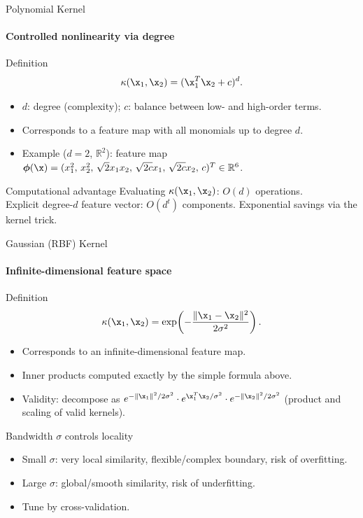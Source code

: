 \begin{frame}{Polynomial Kernel}
  \framesubtitle{Controlled nonlinearity via degree}
  \begin{block}{Definition}
    \[
      \kappa(\x_1,\x_2) = (\x_1^T\x_2 + c)^d.
    \]
  \end{block}
  \begin{itemize}
    \item $d$: degree (complexity); $c$: balance between low- and high-order terms.
    \item Corresponds to a feature map with all monomials up to degree $d$.
    \item Example ($d=2$, $\mathbb{R}^2$): feature map
          $\boldsymbol{\phi}(\x) = (x_1^2,\,x_2^2,\,\sqrt{2}x_1x_2,\,\sqrt{2c}x_1,\,\sqrt{2c}x_2,\,c)^T \in \mathbb{R}^6$.
  \end{itemize}
  \begin{block}{Computational advantage}
    Evaluating $\kappa(\x_1,\x_2)$: $O(d)$ operations.\\
    Explicit degree-$d$ feature vector: $O(d^t)$ components.
    \alert{Exponential savings} via the kernel trick.
  \end{block}
\end{frame}

\begin{frame}{Gaussian (RBF) Kernel}
  \framesubtitle{Infinite-dimensional feature space}
  \begin{block}{Definition}
    \[
      \kappa(\x_1,\x_2) = \exp\!\left(-\frac{\|\x_1-\x_2\|^2}{2\sigma^2}\right).
    \]
  \end{block}
  \begin{itemize}
    \item Corresponds to an \alert{infinite-dimensional} feature map.
    \item Inner products computed exactly by the simple formula above.
    \item Validity: decompose as $e^{-\|\x_1\|^2/2\sigma^2} \cdot e^{\x_1^T\x_2/\sigma^2}
          \cdot e^{-\|\x_2\|^2/2\sigma^2}$ (product and scaling of valid kernels).
  \end{itemize}
  \begin{block}{Bandwidth $\sigma$ controls locality}
    \begin{itemize}
      \item Small $\sigma$: very local similarity, flexible/complex boundary, risk of \alert{overfitting}.
      \item Large $\sigma$: global/smooth similarity, risk of \alert{underfitting}.
      \item Tune by cross-validation.
    \end{itemize}
  \end{block}
\end{frame}

